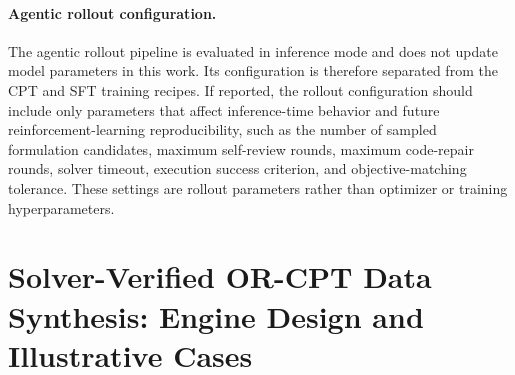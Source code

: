 \paragraph{Agentic rollout configuration.}
The agentic rollout pipeline is evaluated in inference mode and does not update
model parameters in this work. Its configuration is therefore separated from
the CPT and SFT training recipes. If reported, the rollout configuration should
include only parameters that affect inference-time behavior and future
reinforcement-learning reproducibility, such as the number of sampled
formulation candidates, maximum self-review rounds, maximum code-repair rounds,
solver timeout, execution success criterion, and objective-matching tolerance.
These settings are rollout parameters rather than optimizer or training
hyperparameters.



%
%
%



\section{Solver-Verified OR-CPT Data Synthesis: Engine Design and Illustrative Cases}
\label{app:or-cpt-engine}

